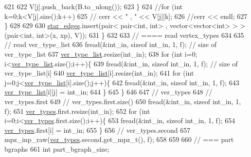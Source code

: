 \begin{DoxyCode}
621 
622         V[j].push\_back(B.to\_ulong());
623       \}
624       \textcolor{comment}{//for (int k=0;k<V[j].size();k++)}
625       \textcolor{comment}{//  cerr << " , " << V[j][k];}
626       \textcolor{comment}{//cerr << endl;}
627     \}
628 
629 
630     \hyperlink{classmarked__graph__compressed_a7df5779d313486644132bd816937f532}{star\_edges}.insert(pair< pair<int, int> , vector<vector<int> > > (pair<int, int>(x, xp), V));
631   \}
632 
633   \textcolor{comment}{// ==== read vertex\_types}
634 
635   \textcolor{comment}{// read ver\_type\_list}
636   fread(&int\_in, \textcolor{keyword}{sizeof} int\_in, 1, f); \textcolor{comment}{// size of ver\_type\_list}
637   \hyperlink{classmarked__graph__compressed_af2e3e55223d436628a02758dfae88493}{ver\_type\_list}.resize(int\_in);
638   \textcolor{keywordflow}{for} (\textcolor{keywordtype}{int} i=0; i<\hyperlink{classmarked__graph__compressed_af2e3e55223d436628a02758dfae88493}{ver\_type\_list}.size();i++)\{
639     fread(&int\_in, \textcolor{keyword}{sizeof} int\_in, 1, f); \textcolor{comment}{// size of ver\_type\_list[i]}
640     \hyperlink{classmarked__graph__compressed_af2e3e55223d436628a02758dfae88493}{ver\_type\_list}[i].resize(int\_in);
641     \textcolor{keywordflow}{for} (\textcolor{keywordtype}{int} j=0;j<\hyperlink{classmarked__graph__compressed_af2e3e55223d436628a02758dfae88493}{ver\_type\_list}[i].size();j++)\{
642       fread(&int\_in, \textcolor{keyword}{sizeof} int\_in, 1, f);
643       \hyperlink{classmarked__graph__compressed_af2e3e55223d436628a02758dfae88493}{ver\_type\_list}[i][j] = int\_in;
644     \}
645   \}
646 
647   \textcolor{comment}{// ver\_types}
648   \textcolor{comment}{// ver\_types.first}
649   \textcolor{comment}{// ver\_types.first.size()}
650   fread(&int\_in, \textcolor{keyword}{sizeof} int\_in, 1, f);
651   \hyperlink{classmarked__graph__compressed_af446cc5e23c241a92b76642fd5ebc403}{ver\_types}.first.resize(int\_in);
652   \textcolor{keywordflow}{for} (\textcolor{keywordtype}{int} i=0;i<\hyperlink{classmarked__graph__compressed_af446cc5e23c241a92b76642fd5ebc403}{ver\_types}.first.size();i++)\{
653     fread(&int\_in, \textcolor{keyword}{sizeof} int\_in, 1, f);
654     \hyperlink{classmarked__graph__compressed_af446cc5e23c241a92b76642fd5ebc403}{ver\_types}.first[i] = int\_in;
655   \}
656   \textcolor{comment}{// ver\_types.second}
657   mpz\_inp\_raw(\hyperlink{classmarked__graph__compressed_af446cc5e23c241a92b76642fd5ebc403}{ver\_types}.second.get\_mpz\_t(), f);
658 
659 
660   \textcolor{comment}{// === part bgraphs}
661   \textcolor{keywordtype}{int} part\_bgraph\_size;

\end{DoxyCode}
